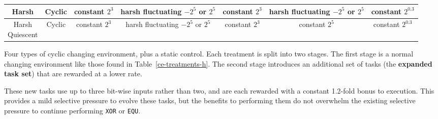 \documentclass[10pt,letterpaper]{article}
\begin{document}
\begin{table}[]
\begin{tabular}{|c|c||c|c||c|c|c|}
	Harsh & Cyclic & \makecell{constant \\ $2^3$} & \makecell{harsh \\ fluctuating \\ $-2^5$ or $2^5$} & \makecell{constant \\ $2^3$} & \makecell{harsh \\ fluctuating \\ $-2^5$ or $2^5$} & \makecell{constant \\ $2^{0.3}$} \\\hline
	\makecell{Harsh \\ Quiescent} & Cyclic & \makecell{constant \\ $2^3$} & \makecell{harsh \\ fluctuating \\ $-2^5$ or $2^5$} & \makecell{constant \\ $2^3$} & \makecell{constant \\ $2^5$} & \makecell{constant \\ $2^{0.3}$} \\\hline
	\end{tabular} 

	\begin{flushleft} Four types of cyclic changing environment, plus a static control. Each treatment is split into two stages. The first stage is a normal changing environment like those found in Table~\ref{ce-treatments-h}. The second stage introduces an additional set of tasks (the \textbf{expanded task set}) that are rewarded at a lower rate.
	\end{flushleft}
	\label{cel-treatments-simple}
	\end{table}

These new tasks use up to three bit-wise inputs rather than two, and are each rewarded with a constant 1.2-fold bonus to execution. This provides a mild selective pressure to evolve these tasks, but the benefits to performing them do not overwhelm the existing selective pressure to continue performing \texttt{XOR} or \texttt{EQU}.
\end{document}

